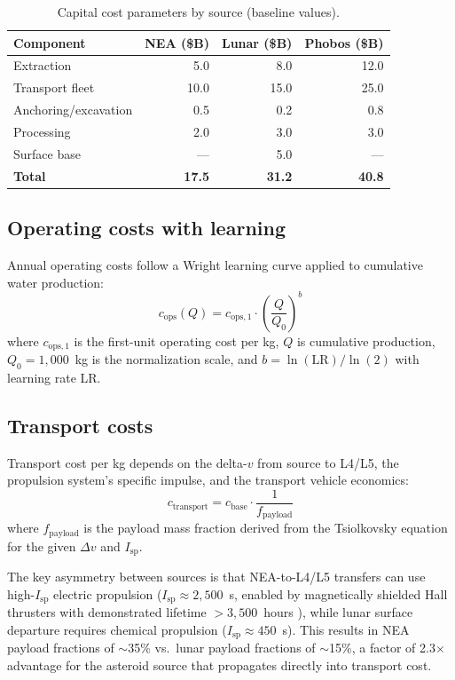 \documentclass[preprint,12pt]{elsarticle}
\begin{document}
\begin{table}[ht]
\centering
\caption{Capital cost parameters by source (baseline values).}
\label{tab:capital}
\begin{tabular}{lrrr}
\toprule
\textbf{Component} & \textbf{NEA (\$B)} & \textbf{Lunar (\$B)} & \textbf{Phobos (\$B)} \\
\midrule
Extraction & 5.0 & 8.0 & 12.0 \\
Transport fleet & 10.0 & 15.0 & 25.0 \\
Anchoring/excavation & 0.5 & 0.2 & 0.8 \\
Processing & 2.0 & 3.0 & 3.0 \\
Surface base & --- & 5.0 & --- \\
\midrule
\textbf{Total} & \textbf{17.5} & \textbf{31.2} & \textbf{40.8} \\
\bottomrule
\end{tabular}
\end{table}

\subsection{Operating costs with learning}

Annual operating costs follow a Wright learning curve applied to cumulative water production:
\begin{equation}
    c_\text{ops}(Q) = c_{\text{ops},1} \cdot \left(\frac{Q}{Q_0}\right)^b
    \label{eq:learning}
\end{equation}
where $c_{\text{ops},1}$ is the first-unit operating cost per kg, $Q$ is cumulative production, $Q_0 = 1{,}000$~kg is the normalization scale, and $b = \ln(\text{LR}) / \ln(2)$ with learning rate LR.

\subsection{Transport costs}

Transport cost per kg depends on the delta-$v$ from source to L4/L5, the propulsion system's specific impulse, and the transport vehicle economics:
\begin{equation}
    c_\text{transport} = c_\text{base} \cdot \frac{1}{f_\text{payload}}
    \label{eq:transport}
\end{equation}
where $f_\text{payload}$ is the payload mass fraction derived from the Tsiolkovsky equation for the given $\Delta v$ and $I_\text{sp}$.

The key asymmetry between sources is that NEA-to-L4/L5 transfers can use high-$I_\text{sp}$ electric propulsion ($I_\text{sp} \approx 2{,}500$~s, enabled by magnetically shielded Hall thrusters with demonstrated lifetime $>3{,}500$~hours \cite{frieman2019}), while lunar surface departure requires chemical propulsion ($I_\text{sp} \approx 450$~s). This results in NEA payload fractions of $\sim$35\% vs.\ lunar payload fractions of $\sim$15\%, a factor of 2.3$\times$ advantage for the asteroid source that propagates directly into transport cost.
\end{document}
